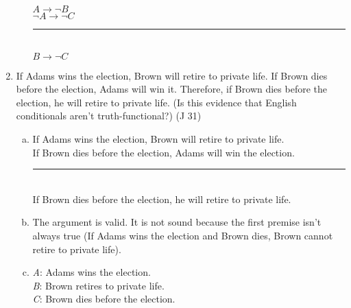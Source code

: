 \documentclass{article}
\begin{document}
\begin{enumerate}
\begin{enumerate}[(a)]
                    $A \to \neg B$\\
                    $\neg A \to \neg C$\\
                    \rule{5em}{.5pt}\\
                    $B \to \neg C$
          \end{enumerate}
    \item If Adams wins the election, Brown will retire to private life. If Brown dies before the election, Adams will win it. Therefore, if Brown dies before the election, he will retire to private life. (Is this evidence that English conditionals aren't truth-functional?) (J 31)
          \begin{enumerate}[(a)]
              \item If Adams wins the election, Brown will retire to private life.\\
                    If Brown dies before the election, Adams will win the election.\\
                    \rule{15em}{.5pt}\\
                    If Brown dies before the election, he will retire to private life.
              \item The argument is valid. It is not sound because the first premise isn't always true (If Adams wins the election and Brown dies, Brown cannot retire to private life).
              \item \textit{A}: Adams wins the election.\\
                    \textit{B}: Brown retires to private life.\\
                    \textit{C}: Brown dies before the election.\\


\end{enumerate}
\end{enumerate}
\end{document}
